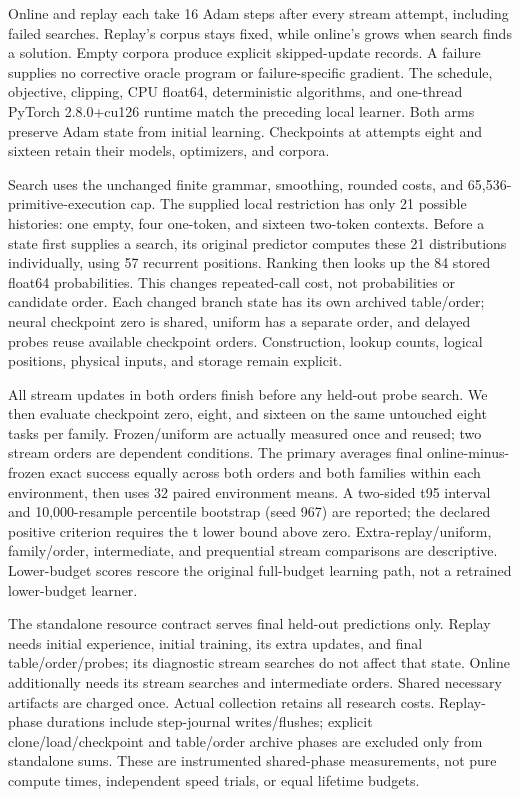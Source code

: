 \documentclass[11pt]{article}
\begin{document}
Online and replay each take 16 Adam steps after every stream attempt, including
failed searches. Replay's corpus stays fixed, while online's grows when search
finds a solution. Empty corpora produce explicit skipped-update records. A
failure supplies no corrective oracle program or failure-specific gradient.
The schedule, objective, clipping, CPU float64, deterministic algorithms, and
one-thread PyTorch 2.8.0+cu126 runtime match the preceding local learner. Both
arms preserve Adam state from initial learning. Checkpoints at attempts eight
and sixteen retain their models, optimizers, and corpora.

Search uses the unchanged finite grammar, smoothing, rounded costs, and
65,536-primitive-execution cap. The supplied local restriction has only 21
possible histories: one empty, four one-token, and sixteen two-token contexts.
Before a state first supplies a search, its original predictor computes these
21 distributions individually, using 57 recurrent positions. Ranking then
looks up the 84 stored float64 probabilities. This changes repeated-call cost,
not probabilities or candidate order. Each changed branch state has its own
archived table/order; neural checkpoint zero is shared, uniform has a separate
order, and delayed probes reuse available checkpoint orders. Construction,
lookup counts, logical positions, physical inputs, and storage remain explicit.

All stream updates in both orders finish before any held-out probe search.
We then evaluate checkpoint zero, eight, and sixteen on the same untouched
eight tasks per family. Frozen/uniform are actually measured once and reused;
two stream orders are dependent conditions. The primary averages final
online-minus-frozen exact success equally across both orders and both families
within each environment, then uses 32 paired environment means. A two-sided
t95 interval and 10,000-resample percentile bootstrap (seed 967) are reported;
the declared positive criterion requires the t lower bound above zero.
Extra-replay/uniform, family/order, intermediate, and prequential stream
comparisons are descriptive. Lower-budget scores rescore the original
full-budget learning path, not a retrained lower-budget learner.

The standalone resource contract serves final held-out predictions only.
Replay needs initial experience, initial training, its extra updates, and
final table/order/probes; its diagnostic stream searches do not affect that
state. Online additionally needs its stream searches and intermediate orders.
Shared necessary artifacts are charged once. Actual collection retains all
research costs. Replay-phase durations include step-journal writes/flushes;
explicit clone/load/checkpoint and table/order archive phases are excluded
only from standalone sums. These are instrumented shared-phase measurements,
not pure compute times, independent speed trials, or equal lifetime budgets.
\end{document}
